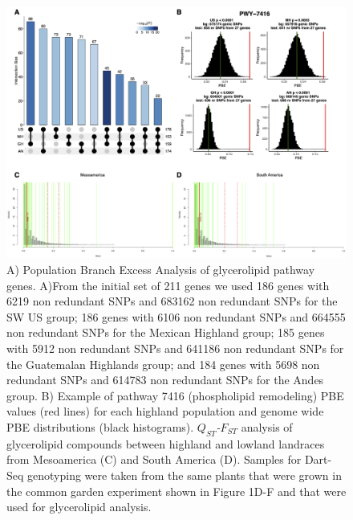 \documentclass[9pt,twocolumn,twoside,lineno]{BioRxiv}
\begin{document}
\setcounter{figure}{0}
\setcounter{table}{0}
\begin{figure}[t]
\begin{center}
\includegraphics[width=0.8\paperwidth]{Sup_Figures/Sup_Fig_1.png}
\caption{A) Population Branch Excess Analysis of glycerolipid pathway genes.
A)From the initial set of 211 genes we used 186 genes with 6219 non redundant SNPs and 683162 non redundant SNPs for the SW US group; 186 genes with 6106 non redundant SNPs and 664555 non redundant SNPs for the Mexican Highland group; 185 genes with 5912 non redundant SNPs and 641186 non redundant SNPs for the Guatemalan Highlands group; and 184 genes with 5698 non redundant SNPs and 614783 non redundant SNPs for the Andes group.
B) Example of pathway 7416 (phospholipid remodeling) PBE values (red lines) for each highland population and genome wide PBE distributions (black histograms). 
\textit{$Q_{ST}$-$F_{ST}$} analysis of glycerolipid compounds between highland and lowland landraces from Mesoamerica (C) and South America (D).
Samples for Dart-Seq genotyping were taken from the same plants that were grown in the common garden experiment shown in Figure 1D-F and that were used for glycerolipid analysis. 
}
\label{SupFig1}
\end{center}
\end{figure} 

\clearpage
\end{document}
